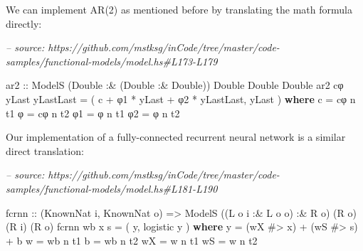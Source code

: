 \documentclass[]{article}
\newenvironment{Shaded}{}{}
\newcommand{\CommentTok}[1]{\textcolor[rgb]{0.38,0.63,0.69}{\textit{#1}}}
\newcommand{\DataTypeTok}[1]{\textcolor[rgb]{0.56,0.13,0.00}{#1}}
\newcommand{\FunctionTok}[1]{\textcolor[rgb]{0.02,0.16,0.49}{#1}}
\newcommand{\KeywordTok}[1]{\textcolor[rgb]{0.00,0.44,0.13}{\textbf{#1}}}
\newcommand{\NormalTok}[1]{#1}
\newcommand{\OtherTok}[1]{\textcolor[rgb]{0.00,0.44,0.13}{#1}}
\begin{document}
We can implement AR(2) as mentioned before by translating the math formula
directly:

\begin{Shaded}
\begin{Highlighting}[]
\CommentTok{-- source: https://github.com/mstksg/inCode/tree/master/code-samples/functional-models/model.hs#L173-L179}

\OtherTok{ar2 ::} \DataTypeTok{ModelS}\NormalTok{ (}\DataTypeTok{Double} \FunctionTok{:&}\NormalTok{ (}\DataTypeTok{Double} \FunctionTok{:&} \DataTypeTok{Double}\NormalTok{)) }\DataTypeTok{Double} \DataTypeTok{Double} \DataTypeTok{Double}
\NormalTok{ar2 cφ yLast yLastLast }\FunctionTok{=}\NormalTok{ ( c }\FunctionTok{+}\NormalTok{ φ1 }\FunctionTok{*}\NormalTok{ yLast }\FunctionTok{+}\NormalTok{ φ2 }\FunctionTok{*}\NormalTok{ yLastLast, yLast )}
  \KeywordTok{where}
\NormalTok{    c  }\FunctionTok{=}\NormalTok{ cφ }\FunctionTok{^^.}\NormalTok{ t1}
\NormalTok{    φ  }\FunctionTok{=}\NormalTok{ cφ }\FunctionTok{^^.}\NormalTok{ t2}
\NormalTok{    φ1 }\FunctionTok{=}\NormalTok{ φ  }\FunctionTok{^^.}\NormalTok{ t1}
\NormalTok{    φ2 }\FunctionTok{=}\NormalTok{ φ  }\FunctionTok{^^.}\NormalTok{ t2}
\end{Highlighting}
\end{Shaded}

Our implementation of a fully-connected recurrent neural network is a similar
direct translation:

\begin{Shaded}
\begin{Highlighting}[]
\CommentTok{-- source: https://github.com/mstksg/inCode/tree/master/code-samples/functional-models/model.hs#L181-L190}

\NormalTok{fcrnn}
\OtherTok{    ::}\NormalTok{ (}\DataTypeTok{KnownNat}\NormalTok{ i, }\DataTypeTok{KnownNat}\NormalTok{ o)}
    \OtherTok{=>} \DataTypeTok{ModelS}\NormalTok{ ((}\DataTypeTok{L}\NormalTok{ o i }\FunctionTok{:&} \DataTypeTok{L}\NormalTok{ o o) }\FunctionTok{:&} \DataTypeTok{R}\NormalTok{ o) (}\DataTypeTok{R}\NormalTok{ o) (}\DataTypeTok{R}\NormalTok{ i) (}\DataTypeTok{R}\NormalTok{ o)}
\NormalTok{fcrnn wb x s }\FunctionTok{=}\NormalTok{ ( y, logistic y )}
  \KeywordTok{where}
\NormalTok{    y  }\FunctionTok{=}\NormalTok{ (wX }\FunctionTok{#>}\NormalTok{ x) }\FunctionTok{+}\NormalTok{ (wS }\FunctionTok{#>}\NormalTok{ s) }\FunctionTok{+}\NormalTok{ b}
\NormalTok{    w  }\FunctionTok{=}\NormalTok{ wb }\FunctionTok{^^.}\NormalTok{ t1}
\NormalTok{    b  }\FunctionTok{=}\NormalTok{ wb }\FunctionTok{^^.}\NormalTok{ t2}
\NormalTok{    wX }\FunctionTok{=}\NormalTok{ w  }\FunctionTok{^^.}\NormalTok{ t1}
\NormalTok{    wS }\FunctionTok{=}\NormalTok{ w  }\FunctionTok{^^.}\NormalTok{ t2}
\end{Highlighting}
\end{Shaded}
\end{document}
